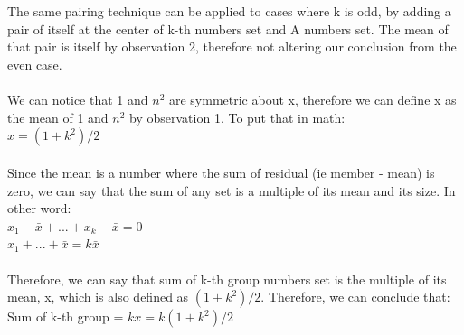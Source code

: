 \begin{enumerate}
        \\
        \\The same pairing technique can be applied to cases where k is odd, by adding a pair of itself at the center of k-th numbers set and A numbers set. The mean of that pair is itself by observation 2, therefore not altering our conclusion from the even case.
        \\
        \\We can notice that 1 and $n^2$ are symmetric about x, therefore we can define x as the mean of 1 and $n^2$ by observation 1. To put that in math:
        \\$x = (1+k^2)/2$
        \\
        \\Since the mean is a number where the sum of residual (ie member - mean) is zero, we can say that the sum of any set is a multiple of its mean and its size. In other word:
        \\$x_1-\bar{x}+...+x_k-\bar{x} = 0$
        \\$x_1+...+\bar{x} = k\bar{x}$
        \\
        \\Therefore, we can say that sum of k-th group numbers set is the multiple of its mean, x, which is also defined as $(1+k^2)/2$. Therefore, we can conclude that:
        \\Sum of k-th group = $kx  = k(1+k^2)/2$
        \\
        \\\boxed{}
        \end{enumerate}
\vfill
        

\newpage
